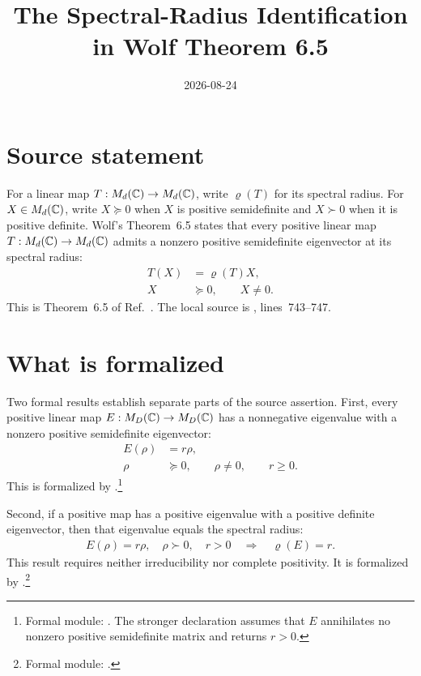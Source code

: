 \documentclass{article}
\title{The Spectral-Radius Identification in Wolf Theorem 6.5}
\author{}
\date{2026-08-24}
\begin{document}
\maketitle
{}

\section{Source statement}

For a linear map $T:M_{d}(\mathbb{C})\to M_{d}(\mathbb{C})$, write $\varrho(T)$ for its spectral
radius. For $X\in M_{d}(\mathbb{C})$, write $X\succeq0$ when $X$ is positive
semidefinite and $X\succ0$ when it is positive definite. Wolf's
Theorem~6.5 states that every positive linear map
$T:M_{d}(\mathbb{C})\to M_{d}(\mathbb{C})$ admits a nonzero positive semidefinite eigenvector at its
spectral radius:
\begin{align}
    T(X)
        &=\varrho(T)X,
    \label{eq:wolf_ch6_spectral_radius_eigenvalue_source_eigenvalue_equation}\\
    X
        &\succeq0,
        \qquad X\neq0.
    \label{eq:wolf_ch6_spectral_radius_eigenvalue_source_positive_eigenvector}
\end{align}
This is Theorem~6.5 of Ref.~\cite{Wolf2012Quantum}. The local source is
,
lines~743--747.

\section{What is formalized}

Two formal results establish separate parts of the source assertion. First,
every positive linear map $E:M_{D}(\mathbb{C})\to M_{D}(\mathbb{C})$ has a nonnegative eigenvalue
with a nonzero positive semidefinite eigenvector:
\begin{align}
    E(\rho)
        &=r\rho,
    \label{eq:wolf_ch6_spectral_radius_eigenvalue_formal_existence_equation}\\
    \rho
        &\succeq0,
        \qquad \rho\neq0,
        \qquad r\geq0.
    \label{eq:wolf_ch6_spectral_radius_eigenvalue_formal_existence_conditions}
\end{align}
This is formalized by
.\footnote{Formal module:
    . The stronger
    declaration  assumes that $E$
    annihilates no nonzero positive semidefinite matrix and returns $r>0$.}

Second, if a positive map has a positive eigenvalue with a positive definite
eigenvector, then that eigenvalue equals the spectral radius:
\begin{align}
    E(\rho)=r\rho,
    \quad \rho\succ0,
    \quad r>0
        \quad\Longrightarrow\quad
        \varrho(E)=r.
    \label{eq:wolf_ch6_spectral_radius_eigenvalue_positive_definite_identification}
\end{align}
This result requires neither irreducibility nor complete positivity. It is
formalized by
.\footnote{Formal
    module: .}
\end{document}
